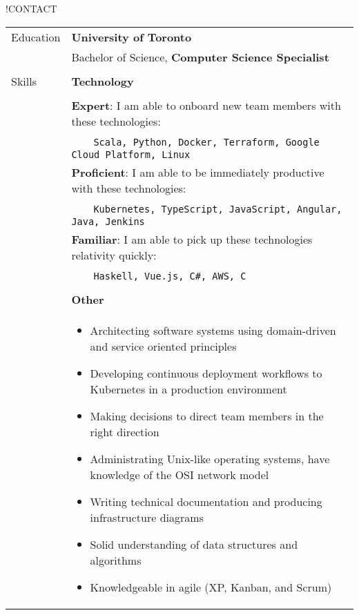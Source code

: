 \documentclass[letterpaper,12pt,oneside]{article}
\newcommand{\tabitem}{~~\llap{\textbullet}~~}
\begin{document}
!CONTACT

\noindent \begin{longtable}{@{} l p{14cm}}
\Large{Education} & \textbf{University of Toronto} \\
                  & Bachelor of Science, \textbf{Computer Science Specialist} \\
                  & \\
\Large{Skills}
& \large{\textbf{Technology}} \\
& \\
& \textbf{Expert}: I am able to onboard new team members with these technologies: \\
& \vspace{0.2cm} \tabitem \texttt{Scala, Python, Docker, Terraform, Google Cloud Platform, Linux} \\
& \textbf{Proficient}: I am able to be immediately productive with these technologies: \\
& \vspace{0.2cm} \tabitem \texttt{Kubernetes, TypeScript, JavaScript, Angular, Java, Jenkins} \\
& \textbf{Familiar}: I am able to pick up these technologies relativity quickly: \\
& \vspace{0.2cm} \tabitem \texttt{Haskell, Vue.js, C\#, AWS, C} \\
& \\
& \large{\textbf{Other}} \\
& \begin{itemize}[leftmargin=*,topsep=0pt,partopsep=0pt]
      \setlength\itemsep{0em}
      \item Architecting software systems using domain-driven and service oriented principles
      \item Developing continuous deployment workflows to Kubernetes in a production environment
      \item Making decisions to direct team members in the right direction
      \item Administrating Unix-like operating systems, have knowledge of the OSI network model
      \item Writing technical documentation and producing infrastructure diagrams
      \item Solid understanding of data structures and algorithms
      \item Knowledgeable in agile (XP, Kanban, and Scrum)
\end{itemize} \\

\end{longtable}
\end{document}
